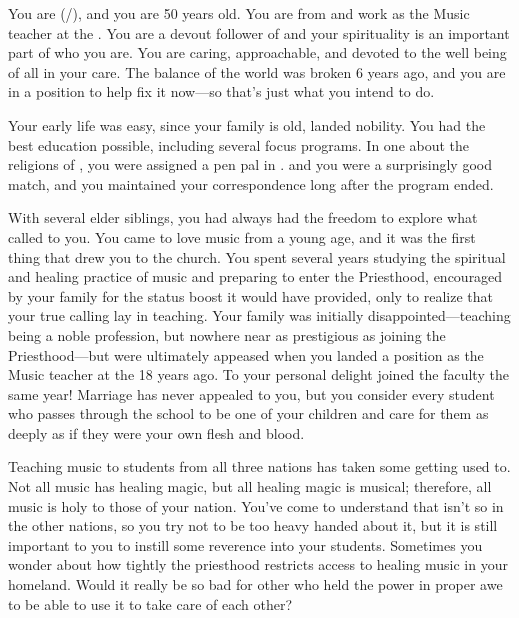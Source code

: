 \documentclass[char]{GL2020}
\begin{document}
\name{\cMusic{}}

You are \cMusic{\full} (\cMusic{\they}/\cMusic{\them}), and you are 50 years old. You are from \pFarm{} and work as the Music teacher at the \pSchool{}. You are a devout follower of \cFarmGod{} and your spirituality is an important part of who you are. You are caring, approachable, and devoted to the well being of all in your care. The balance of the world was broken 6 years ago, and you are in a position to help fix it now---so that's just what you intend to do.

Your early life was easy, since your family is old, landed nobility. You had the best education possible, including several focus programs. In one about the religions of \pEarth{}, you were assigned a pen pal in \pTech{}. \cBeetle{\full} and you were a surprisingly good match, and you maintained your correspondence long after the program ended.

With several elder siblings, you had always had the freedom to explore what called to you. You came to love music from a young age, and it was the first thing that drew you to the church. You spent several years studying the spiritual and healing practice of music and preparing to enter the Priesthood, encouraged by your family for the status boost it would have provided, only to realize that your true calling lay in teaching. Your family was initially disappointed---teaching being a noble profession, but nowhere near as prestigious as joining the Priesthood---but were ultimately appeased when you landed a position as the Music teacher at the \pSchool{} 18 years ago. To your personal delight \cBeetle{} joined the faculty the same year! Marriage has never appealed to you, but you consider every student who passes through the school to be one of your children and care for them as deeply as if they were your own flesh and blood.

Teaching music to students from all three nations has taken some getting used to. Not all music has healing magic, but all \pFarm{} healing magic is musical; therefore, all music is holy to those of your nation. You've come to understand that isn't so in the other nations, so you try not to be too heavy handed about it, but it is still important to you to instill some reverence into your students. Sometimes you wonder about how tightly the priesthood restricts access to healing music in your homeland. Would it really be so bad for other \pFarmers{} who held the power in proper awe to be able to use it to take care of each other?
\end{document}
